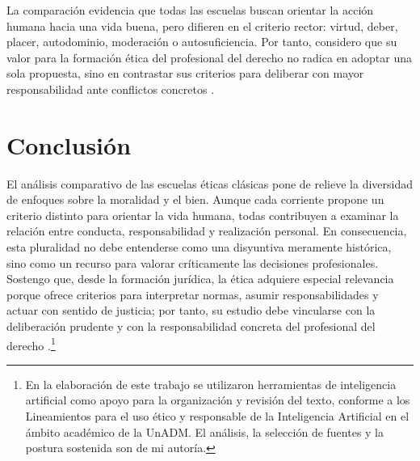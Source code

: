 \documentclass[
	spanish, %
	letterpaper, oneside
]{article}
\begin{document}
La comparación evidencia que todas las escuelas buscan orientar la acción humana hacia una vida buena, pero difieren en el criterio rector: virtud, deber, placer, autodominio, moderación o autosuficiencia. Por tanto, considero que su valor para la formación ética del profesional del derecho no radica en adoptar una sola propuesta, sino en contrastar sus criterios para deliberar con mayor responsabilidad ante conflictos concretos \citep{huerta2000etica,prieto2009favor}.

\section{Conclusión}

El análisis comparativo de las escuelas éticas clásicas pone de relieve la diversidad de enfoques sobre la moralidad y el bien. Aunque cada corriente propone un criterio distinto para orientar la vida humana, todas contribuyen a examinar la relación entre conducta, responsabilidad y realización personal. En consecuencia, esta pluralidad no debe entenderse como una disyuntiva meramente histórica, sino como un recurso para valorar críticamente las decisiones profesionales. Sostengo que, desde la formación jurídica, la ética adquiere especial relevancia porque ofrece criterios para interpretar normas, asumir responsabilidades y actuar con sentido de justicia; por tanto, su estudio debe vincularse con la deliberación prudente y con la responsabilidad concreta del profesional del derecho \citep{ronquillo2018etica,huerta2000etica}.\footnote{En la elaboración de este trabajo se utilizaron herramientas de inteligencia artificial como apoyo para la organización y revisión del texto, conforme a los Lineamientos para el uso ético y responsable de la Inteligencia Artificial en el ámbito académico de la UnADM. El análisis, la selección de fuentes y la postura sostenida son de mi autoría.}



\end{document}
